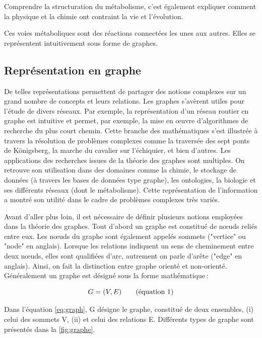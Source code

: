 \begin{refsegment}
    Comprendre la structuration du métabolisme, c'est également expliquer comment la physique et la chimie ont contraint la vie et l'évolution.
    
    Ces voies métaboliques sont des réactions connectées les unes aux autres. Elles se représentent intuitivement sous forme de graphes.
    
    \subsection{Représentation en graphe}
    
    De telles représentations permettent de partager des notions complexes sur un grand nombre de concepts et leurs relations. Les graphes s'avèrent utiles pour l'étude de divers réseaux. Par exemple, la représentation d'un réseau routier en graphe est intuitive et permet, par exemple, la mise en œuvre d'algorithmes de recherche du plus court chemin. Cette branche des mathématiques s'est illustrée à travers la résolution de problèmes complexes comme la traversée des sept ponts de Königsberg, la marche du cavalier sur l'échiquier, et bien d'autres. Les applications des recherches issues de la théorie des graphes sont multiples. On retrouve son utilisation dans des domaines comme la chimie, le stockage de données (à travers les bases de données type graphe), les ontologies, la biologie et ses différents réseaux (dont le métabolisme). Cette représentation de l'information a montré son utilité dans le cadre de problèmes complexes très variés.
    
    Avant d'aller plus loin, il est nécessaire de définir plusieurs notions employées dans la théorie des graphes. Tout d'abord un graphe est constitué de nœuds reliés entre eux. Les nœuds du graphe sont également appelés sommets ("vertice" ou "node" en anglais).  Lorsque les relations indiquent un sens de cheminement entre deux nœuds, elles sont qualifiées d'arc, autrement on parle d'arête ("edge" en anglais). Ainsi, on fait la distinction entre graphe orienté et non-orienté. Généralement un graphe est désigné sous la forme mathématique :
    
    \begin{equation}\label{eq:graph}
    	G = (V,E) \stepcounter{equation}\tag{équation \theequation}
    \end{equation}
    
    Dans l'équation \ref{eq:graph}, G désigne le graphe, constitué de deux ensembles, (i) celui des sommets V, (ii) et celui des relations E. Différents types de graphe sont présentés dans la \cref{fig:graphe}.
    

\end{refsegment}
